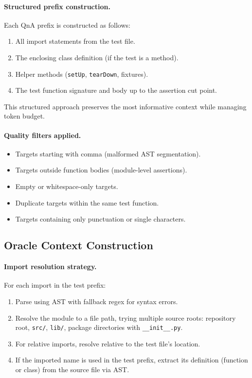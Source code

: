 \documentclass[11pt]{article}
\begin{document}
\paragraph{Structured prefix construction.}
Each QnA prefix is constructed as follows:
\begin{enumerate}[nosep]
    \item All import statements from the test file.
    \item The enclosing class definition (if the test is a method).
    \item Helper methods (\texttt{setUp}, \texttt{tearDown}, fixtures).
    \item The test function signature and body up to the assertion cut point.
\end{enumerate}
This structured approach preserves the most informative context while managing token budget.

\paragraph{Quality filters applied.}
\begin{itemize}[nosep]
    \item Targets starting with comma (malformed AST segmentation).
    \item Targets outside function bodies (module-level assertions).
    \item Empty or whitespace-only targets.
    \item Duplicate targets within the same test function.
    \item Targets containing only punctuation or single characters.
\end{itemize}

\subsection{Oracle Context Construction}

\paragraph{Import resolution strategy.}
For each import in the test prefix:
\begin{enumerate}[nosep]
    \item Parse using AST with fallback regex for syntax errors.
    \item Resolve the module to a file path, trying multiple source roots: repository root, \texttt{src/}, \texttt{lib/}, package directories with \texttt{\_\_init\_\_.py}.
    \item For relative imports, resolve relative to the test file's location.
    \item If the imported name is used in the test prefix, extract its definition (function or class) from the source file via AST.
\end{enumerate}
\end{document}
